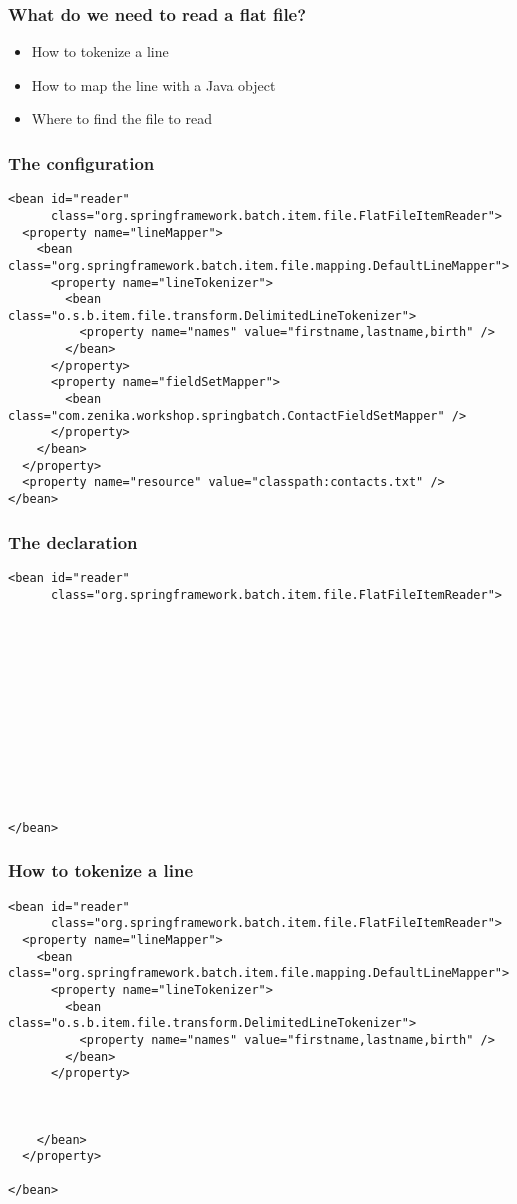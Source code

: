 \begin{frame}
 \frametitle{What do we need to read a flat file?}
 \begin{itemize}
  \item How to tokenize a line
  \item How to map the line with a Java object
  \item Where to find the file to read
 \end{itemize}
\end{frame}


\begin{frame}[fragile]
 \frametitle{The  configuration}

\lstset{language=XML}
\begin{lstlisting}
<bean id="reader"
      class="org.springframework.batch.item.file.FlatFileItemReader">
  <property name="lineMapper">
    <bean class="org.springframework.batch.item.file.mapping.DefaultLineMapper">
      <property name="lineTokenizer">
        <bean class="o.s.b.item.file.transform.DelimitedLineTokenizer">
          <property name="names" value="firstname,lastname,birth" />
        </bean>
      </property>
      <property name="fieldSetMapper">
        <bean class="com.zenika.workshop.springbatch.ContactFieldSetMapper" />
      </property>
    </bean>
  </property>
  <property name="resource" value="classpath:contacts.txt" />
</bean>
\end{lstlisting}

\end{frame}

\begin{frame}[fragile]
 \frametitle{The  declaration}

\lstset{language=XML}
\begin{lstlisting}
<bean id="reader"
      class="org.springframework.batch.item.file.FlatFileItemReader">













</bean>
\end{lstlisting}

\end{frame}

\begin{frame}[fragile]
 \frametitle{How to tokenize a line}

\lstset{language=XML}
\begin{lstlisting}
<bean id="reader"
      class="org.springframework.batch.item.file.FlatFileItemReader">
  <property name="lineMapper">
    <bean class="org.springframework.batch.item.file.mapping.DefaultLineMapper">
      <property name="lineTokenizer">
        <bean class="o.s.b.item.file.transform.DelimitedLineTokenizer">
          <property name="names" value="firstname,lastname,birth" />
        </bean>
      </property>



    </bean>
  </property>

</bean>
\end{lstlisting}
\end{frame}

